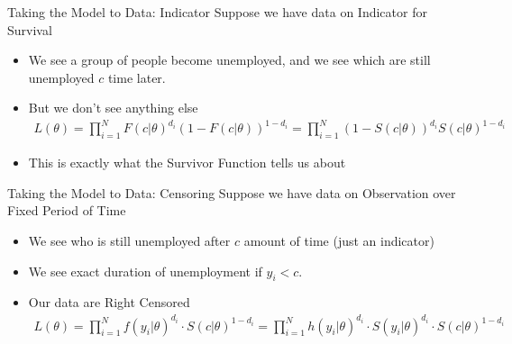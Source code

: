 \documentclass[aspectratio=169]{beamer}
\begin{document}
\begin{frame}{Taking the Model to Data: Indicator}
Suppose we have data on \alert{Indicator for Survival}
\begin{itemize}
\item We see a group of people become unemployed, and we see which are still unemployed $c$ time later.
\item But we don't see anything else
\begin{align*}
L(\theta) = \prod_{i=1}^N F(c | \theta)^{d_i} (1-F(c | \theta))^{1-d_i}  = \prod_{i=1}^N (1-S(c | \theta))^{d_i} S(c | \theta)^{1-d_i}  
\end{align*}
\item This is exactly what the Survivor Function tells us about
\end{itemize}
\end{frame}



\begin{frame}{Taking the Model to Data: Censoring}
Suppose we have data on \alert{Observation over Fixed Period of Time}
\begin{itemize}
\item We see who is still unemployed after $c$ amount of time (just an indicator)
\item We see exact duration of unemployment if $y_i < c$.
\item Our data are \alert{Right Censored}
\begin{align*}
L ( \theta ) = \prod _ { i = 1 } ^ { N } f \left( y _ { i } | \theta \right) ^ { d _ { i } } \cdot S ( c | \theta ) ^ { 1 - d _ { i } } = \prod _ { i = 1 } ^ { N } h \left( y _ { i } | \theta \right) ^ { d _ { i } } \cdot S \left( y _ { i } | \theta \right) ^ { d _ { i } } \cdot S ( c | \theta ) ^ { 1 - d _ { i } }
\end{align*}
\end{itemize}
\end{frame}
\end{document}

